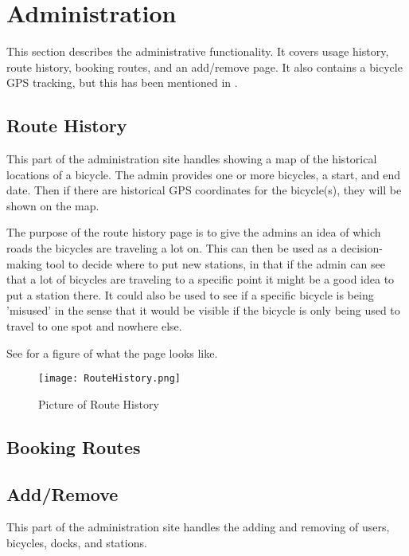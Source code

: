 \section{Administration}
This section describes the administrative functionality. 
It covers usage history, route history, booking routes, and an add/remove page.
It also contains a bicycle GPS tracking, but this has been mentioned in .

\subsection{Route History}
This part of the administration site handles showing a map of the historical locations of a bicycle.
The admin provides one or more bicycles, a start, and end date.
Then if there are historical GPS coordinates for the bicycle(s), they will be shown on the map. 

The purpose of the route history page is to give the admins an idea of which roads the bicycles are traveling a lot on. 
This can then be used as a decision-making tool to decide where to put new stations, in that if the admin can see that a lot of bicycles are traveling to a specific point it might be a good idea to put a station there.
It could also be used to see if a specific bicycle is being 'misused' in the sense that it would be visible if the bicycle is only being used to travel to one spot and nowhere else.

See  for a figure of what the page looks like.

\begin{figure}[H]
	\centering
	\texttt{[image: RouteHistory.png]}
	\caption{Picture of Route History}
	\label{fig:routehistory}
\end{figure}


\subsection{Booking Routes}

\subsection{Add/Remove}
This part of the administration site handles the adding and removing of users, bicycles, docks, and stations.

